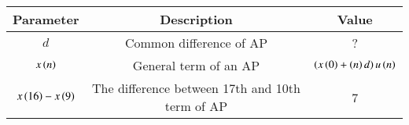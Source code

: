     \begin{tabular}{|c|c|c|}
        \hline
        \textbf{Parameter} & \textbf{Description} & \textbf{Value} \\
        \hline
        $d$ & Common difference of AP & ? \\ \hline
        $x\left(n\right)$ & General term of an AP & $\left(x\left(0\right) + \left(n\right)d\right)u\left(n\right)$ \\ \hline
        $x\left(16\right) - x\left(9\right)$ & The difference between 17th and 10th term of AP & 7  \\ 
        \hline
    \end{tabular}

